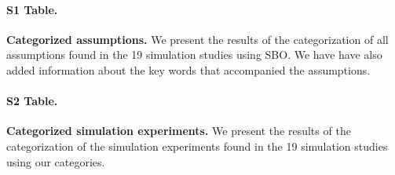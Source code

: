 \documentclass[10pt,letterpaper]{article}
\newcommand{\question}[1]{\textcolor{red}{#1}}
\begin{document}
\paragraph*{S1 Table.}\label{S1_TableAssumptions}
{\bf Categorized assumptions.} We present the results of the categorization of all assumptions found in the 19 simulation studies using SBO. We have have also added information about the key words that accompanied the assumptions.

\paragraph*{S2 Table.}\label{S1_TableExperiments}
{\bf Categorized simulation experiments.} We present the results of the categorization of the simulation experiments found in the 19 simulation studies using our categories.






\end{document}
